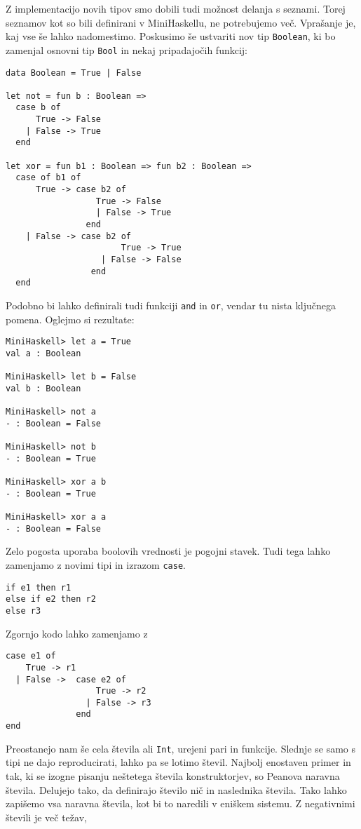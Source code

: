 \documentclass[12pt,a4paper,openany]{book}
\begin{document}
Z implementacijo novih tipov smo dobili tudi možnost delanja s seznami. Torej seznamov kot so bili definirani v MiniHaskellu, ne potrebujemo več. Vprašanje je, kaj vse še lahko nadomestimo.
Poskusimo še ustvariti nov tip \lstinline{Boolean}, ki bo zamenjal osnovni tip \lstinline{Bool} in nekaj pripadajočih funkcij:
\begin{lstlisting}
data Boolean = True | False
	
let not = fun b : Boolean => 
  case b of 
      True -> False 
    | False -> True 
  end

let xor = fun b1 : Boolean => fun b2 : Boolean =>
  case of b1 of
      True -> case b2 of
                  True -> False
	              | False -> True
	            end
    | False -> case b2 of
		               True -> True
	               | False -> False
	             end
  end
\end{lstlisting}
Podobno bi lahko definirali tudi funkciji \lstinline{and} in \lstinline{or}, vendar tu nista ključnega pomena. Oglejmo si rezultate:
\begin{lstlisting}
MiniHaskell> let a = True
val a : Boolean

MiniHaskell> let b = False
val b : Boolean

MiniHaskell> not a
- : Boolean = False

MiniHaskell> not b
- : Boolean = True

MiniHaskell> xor a b
- : Boolean = True

MiniHaskell> xor a a
- : Boolean = False
\end{lstlisting}
Zelo pogosta uporaba boolovih vrednosti je pogojni stavek. Tudi tega lahko zamenjamo z novimi tipi in izrazom \lstinline{case}.
\begin{lstlisting}
if e1 then r1
else if e2 then r2
else r3
\end{lstlisting}
Zgornjo kodo lahko zamenjamo z
\begin{lstlisting}
case e1 of
    True -> r1
  | False ->  case e2 of
                  True -> r2
                | False -> r3
              end
end
\end{lstlisting}
Preostanejo nam še cela števila ali \lstinline{Int}, urejeni pari in funkcije. Slednje se samo s tipi ne dajo reproducirati, lahko pa se lotimo števil. Najbolj enostaven primer in tak, ki se izogne pisanju neštetega števila 
konstruktorjev, so Peanova naravna števila. Delujejo tako, da definirajo število nič in naslednika števila. Tako lahko zapišemo vsa naravna števila, kot bi to naredili v eniškem sistemu. Z negativnimi števili je več težav, 
\end{document}
